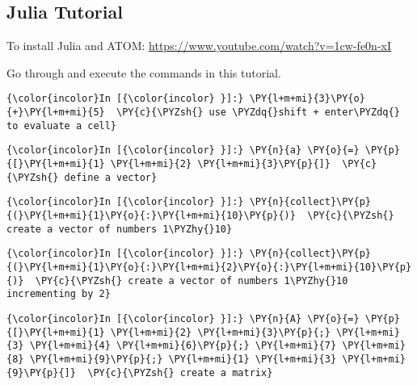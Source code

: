 
\subsection{Julia Tutorial}

To install Julia and ATOM:
\url{https://www.youtube.com/watch?v=1cw-fe0n-xI}



Go through and execute the commands in this tutorial.
    
    \begin{Verbatim}[commandchars=\\\{\}]
{\color{incolor}In [{\color{incolor} }]:} \PY{l+m+mi}{3}\PY{o}{+}\PY{l+m+mi}{5}  \PY{c}{\PYZsh{} use \PYZdq{}shift + enter\PYZdq{} to evaluate a cell}
\end{Verbatim}


    \begin{Verbatim}[commandchars=\\\{\}]
{\color{incolor}In [{\color{incolor} }]:} \PY{n}{a} \PY{o}{=} \PY{p}{[}\PY{l+m+mi}{1} \PY{l+m+mi}{2} \PY{l+m+mi}{3}\PY{p}{]}  \PY{c}{\PYZsh{} define a vector}
\end{Verbatim}


    \begin{Verbatim}[commandchars=\\\{\}]
{\color{incolor}In [{\color{incolor} }]:} \PY{n}{collect}\PY{p}{(}\PY{l+m+mi}{1}\PY{o}{:}\PY{l+m+mi}{10}\PY{p}{)}  \PY{c}{\PYZsh{} create a vector of numbers 1\PYZhy{}10}
\end{Verbatim}


    \begin{Verbatim}[commandchars=\\\{\}]
{\color{incolor}In [{\color{incolor} }]:} \PY{n}{collect}\PY{p}{(}\PY{l+m+mi}{1}\PY{o}{:}\PY{l+m+mi}{2}\PY{o}{:}\PY{l+m+mi}{10}\PY{p}{)}  \PY{c}{\PYZsh{} create a vector of numbers 1\PYZhy{}10 incrementing by 2}
\end{Verbatim}


    \begin{Verbatim}[commandchars=\\\{\}]
{\color{incolor}In [{\color{incolor} }]:} \PY{n}{A} \PY{o}{=} \PY{p}{[}\PY{l+m+mi}{1} \PY{l+m+mi}{2} \PY{l+m+mi}{3}\PY{p}{;} \PY{l+m+mi}{3} \PY{l+m+mi}{4} \PY{l+m+mi}{6}\PY{p}{;} \PY{l+m+mi}{7} \PY{l+m+mi}{8} \PY{l+m+mi}{9}\PY{p}{;} \PY{l+m+mi}{1} \PY{l+m+mi}{3} \PY{l+m+mi}{9}\PY{p}{]}  \PY{c}{\PYZsh{} create a matrix}
\end{Verbatim}



